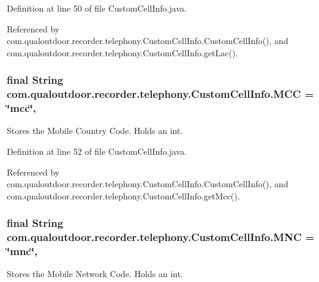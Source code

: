 Definition at line 50 of file Custom\-Cell\-Info.\-java.



Referenced by com.\-qualoutdoor.\-recorder.\-telephony.\-Custom\-Cell\-Info.\-Custom\-Cell\-Info(), and com.\-qualoutdoor.\-recorder.\-telephony.\-Custom\-Cell\-Info.\-get\-Lac().

\hypertarget{classcom_1_1qualoutdoor_1_1recorder_1_1telephony_1_1CustomCellInfo_ad76b1e387100db38e0a1a595549a600e}{
\subsubsection[{M\-C\-C}]{\setlength{\rightskip}{0pt plus 5cm}final String com.\-qualoutdoor.\-recorder.\-telephony.\-Custom\-Cell\-Info.\-M\-C\-C = \char`\"{}mcc\char`\"{}\hspace{0.3cm}{\ttfamily [static]}, {\ttfamily [private]}}}\label{classcom_1_1qualoutdoor_1_1recorder_1_1telephony_1_1CustomCellInfo_ad76b1e387100db38e0a1a595549a600e}
Stores the Mobile Country Code. Holds an int. 

Definition at line 52 of file Custom\-Cell\-Info.\-java.



Referenced by com.\-qualoutdoor.\-recorder.\-telephony.\-Custom\-Cell\-Info.\-Custom\-Cell\-Info(), and com.\-qualoutdoor.\-recorder.\-telephony.\-Custom\-Cell\-Info.\-get\-Mcc().

\hypertarget{classcom_1_1qualoutdoor_1_1recorder_1_1telephony_1_1CustomCellInfo_afd17b782dc967deb719feb1830c4bf08}{
\subsubsection[{M\-N\-C}]{\setlength{\rightskip}{0pt plus 5cm}final String com.\-qualoutdoor.\-recorder.\-telephony.\-Custom\-Cell\-Info.\-M\-N\-C = \char`\"{}mnc\char`\"{}\hspace{0.3cm}{\ttfamily [static]}, {\ttfamily [private]}}}\label{classcom_1_1qualoutdoor_1_1recorder_1_1telephony_1_1CustomCellInfo_afd17b782dc967deb719feb1830c4bf08}
Stores the Mobile Network Code. Holds an int. 

